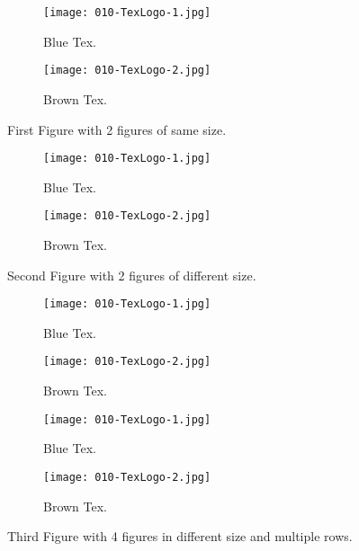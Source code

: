 \documentclass{article}
\begin{document}
	\begin{figure}[h!]
  	\centering
   	\begin{subfigure}[b]{0.4\linewidth}
    	\texttt{[image: 010-TexLogo-1.jpg]}
     	\caption{Blue Tex.}
   	\end{subfigure}
  	\begin{subfigure}[b]{0.4\linewidth}
    	\texttt{[image: 010-TexLogo-2.jpg]}
    	\caption{Brown Tex.}
  	\end{subfigure}
  	\caption{First Figure with 2 figures of same size.}
  	\label{fig:tex1}
	\end{figure}

	\begin{figure}[h!]
  	\centering
  	\begin{subfigure}[b]{0.2\linewidth}
    	\texttt{[image: 010-TexLogo-1.jpg]}
    	\caption{Blue Tex.}
  	\end{subfigure}
    \begin{subfigure}[b]{0.6\linewidth}
    	\texttt{[image: 010-TexLogo-2.jpg]}
    	\caption{Brown Tex.}
  	\end{subfigure}
  	\caption{Second Figure with 2 figures of different size.}
  	\label{fig:tex2}
	\end{figure}

	\begin{figure}[h!]
  	\centering
   	\begin{subfigure}[b]{0.2\linewidth}
    	\texttt{[image: 010-TexLogo-1.jpg]}
     	\caption{Blue Tex.}
   	\end{subfigure}
  	\begin{subfigure}[b]{0.2\linewidth}
    	\texttt{[image: 010-TexLogo-2.jpg]}
    	\caption{Brown Tex.}
  	\end{subfigure}
  	\begin{subfigure}[b]{0.2\linewidth}
    	\texttt{[image: 010-TexLogo-1.jpg]}
    	\caption{Blue Tex.}
  	\end{subfigure}
    \begin{subfigure}[b]{0.5\linewidth}
    	\texttt{[image: 010-TexLogo-2.jpg]}
    	\caption{Brown Tex.}
  	\end{subfigure}
  	\caption{Third Figure with 4 figures in different size and multiple rows.}
  	\label{fig:tex3}
	\end{figure}
\end{document}
